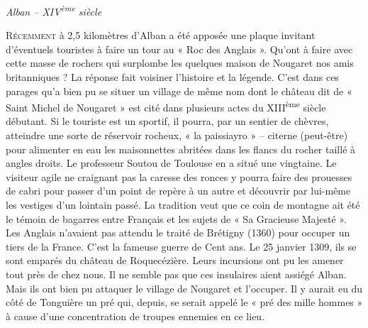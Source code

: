 
\begin{center}
  {\Large\itshape Alban – XIV\textsuperscript{ème} siècle}
\end{center}
\vspace{1.2em}

\noindent
\lettrine{R}{écemment} à 2,5 kilomètres d’Alban a été apposée une plaque invitant d’éventuels touristes à faire un tour au « Roc des Anglais ». Qu’ont à faire avec cette masse de rochers qui surplombe les quelques maison de Nougaret nos amis britanniques ? La réponse fait voisiner l’histoire et la légende. C’est dans ces parages qu’a bien pu se situer un village de même nom dont le château dit de « Saint Michel de Nougaret » est cité dans plusieurs actes du XIII\textsuperscript{ème} siècle débutant. Si le touriste est un sportif, il pourra, par un sentier de chèvres, atteindre une sorte de réservoir rocheux, « la paissiayro » – citerne (peut-être) pour alimenter en eau les maisonnettes abritées dans les flancs du rocher taillé à angles droits. Le professeur Soutou de Toulouse en a situé une vingtaine. Le visiteur agile ne craignant pas la caresse des ronces y pourra faire des prouesses de cabri pour passer d’un point de repère à un autre et découvrir par lui-même les vestiges d’un lointain passé. La tradition veut que ce coin de montagne ait été le témoin de bagarres entre Français et les sujets de « Sa Gracieuse Majesté ». Les Anglais n’avaient pas attendu le traité de Brétigny (1360) pour occuper un tiers de la France. C’est la fameuse guerre de Cent ans. Le 25 janvier 1309, ils se sont emparés du château de Roquecézière. Leurs incursions ont pu les amener tout près de chez nous. Il ne semble pas que ces insulaires aient assiégé Alban. Mais ils ont bien pu attaquer le village de Nougaret et l’occuper. Il y aurait eu du côté de Tonguière un pré qui, depuis, se serait appelé le « pré des mille hommes » à cause d’une concentration de troupes ennemies en ce lieu.

